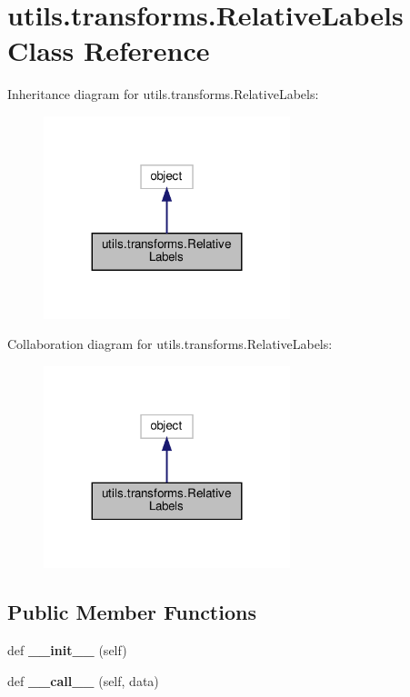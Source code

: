 \hypertarget{classutils_1_1transforms_1_1RelativeLabels}{}\section{utils.\+transforms.\+Relative\+Labels Class Reference}
\label{classutils_1_1transforms_1_1RelativeLabels}


Inheritance diagram for utils.\+transforms.\+Relative\+Labels\+:
\nopagebreak
\begin{figure}[H]
\begin{center}
\leavevmode
\includegraphics[width=203pt]{classutils_1_1transforms_1_1RelativeLabels__inherit__graph}
\end{center}
\end{figure}


Collaboration diagram for utils.\+transforms.\+Relative\+Labels\+:
\nopagebreak
\begin{figure}[H]
\begin{center}
\leavevmode
\includegraphics[width=203pt]{classutils_1_1transforms_1_1RelativeLabels__coll__graph}
\end{center}
\end{figure}
\subsection*{Public Member Functions}
\begin{DoxyCompactItemize}
\item 
\mbox{\label{classutils_1_1transforms_1_1RelativeLabels_af252a7031f9cb24956fbd3e6a6b0714e}} 
def {\bfseries \+\_\+\+\_\+init\+\_\+\+\_\+} (self)
\item 
\mbox{\label{classutils_1_1transforms_1_1RelativeLabels_a3dc1d9340124de71e05fa76c78d43d70}} 
def {\bfseries \+\_\+\+\_\+call\+\_\+\+\_\+} (self, data)
\end{DoxyCompactItemize}


